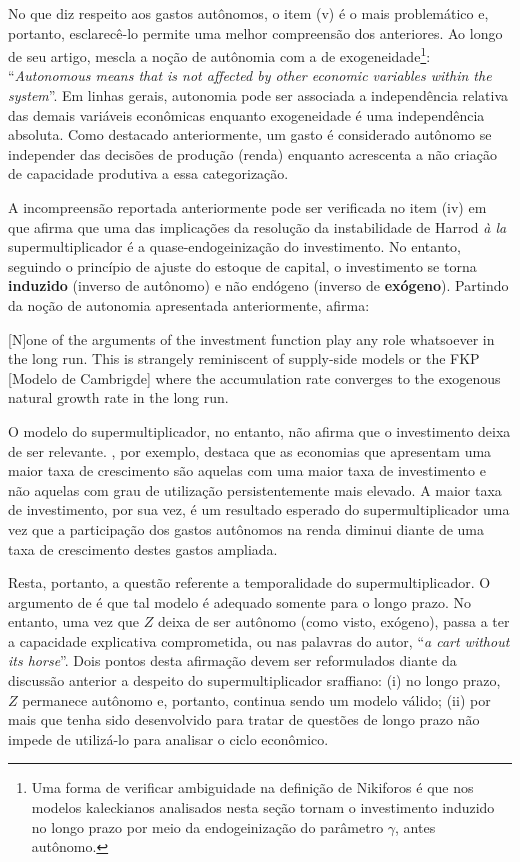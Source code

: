 No que diz respeito aos gastos autônomos, o item (v) é o mais problemático e, portanto, esclarecê-lo permite uma melhor compreensão dos anteriores. Ao longo de seu artigo, \textcite[p.~4]{nikiforos_comments_2018} mescla a noção de autônomia com a de exogeneidade\footnote{Uma forma de verificar ambiguidade na definição de Nikiforos é que nos modelos kaleckianos analisados nesta seção tornam o investimento induzido no longo prazo por meio da endogeinização do parâmetro $\gamma$, antes autônomo. }: ``\textit{Autonomous means that is not affected by other economic variables within the system}''. Em linhas gerais, autonomia pode ser associada a independência relativa das demais variáveis econômicas enquanto exogeneidade é uma independência absoluta. Como destacado anteriormente, um gasto é considerado autônomo se independer das decisões de produção (renda) enquanto \textcite{serrano_sraffian_1995} acrescenta a não criação de capacidade produtiva a essa categorização. 

A incompreensão reportada anteriormente pode ser verificada no item (iv) em que afirma que uma das implicações da resolução da instabilidade de Harrod \textit{à la} supermultiplicador é a quase-endogeinização do investimento. No entanto, seguindo o princípio de ajuste do estoque de capital, o investimento se torna \textbf{induzido} (inverso de autônomo) e não endógeno (inverso de \textbf{exógeno}). Partindo da noção de autonomia apresentada anteriormente, \citeauthor*{nikiforos_comments_2018} afirma:
\begin{citacao}
	
	[N]one of the arguments of the investment function play any role whatsoever in the long run. This is strangely
	reminiscent of supply-side models or the FKP [Modelo de Cambrigde] where the accumulation rate converges to the
	exogenous natural growth rate in the long run. \cite[p.~11--12, comentario adicionado]{nikiforos_comments_2018}
\end{citacao}
O modelo do supermultiplicador, no entanto, não afirma que o investimento deixa de ser relevante. \textcite{dejuan_hidden_2017}, por exemplo, destaca que as economias que apresentam uma maior taxa de crescimento são aquelas com uma maior taxa de investimento e não aquelas com grau de utilização persistentemente mais elevado. A maior taxa de investimento, por sua vez, é um resultado esperado do supermultiplicador uma vez que a participação dos gastos autônomos na renda diminui diante de uma taxa de crescimento destes gastos ampliada.

Resta, portanto, a questão referente a temporalidade do supermultiplicador. O argumento de \citeauthor*{nikiforos_comments_2018} é que tal modelo é adequado somente para o longo prazo. No entanto, uma vez que $Z$ deixa de ser autônomo (como visto, exógeno), passa a ter a capacidade explicativa comprometida, ou nas palavras do autor, ``\textit{a cart without its horse}''. Dois pontos desta afirmação devem ser reformulados diante da discussão anterior a despeito do supermultiplicador sraffiano: (i) no longo prazo, $Z$ permanece autônomo e, portanto, continua sendo um modelo válido; (ii) por mais que tenha sido desenvolvido para tratar de questões de longo prazo não impede de utilizá-lo para analisar o ciclo econômico. 

